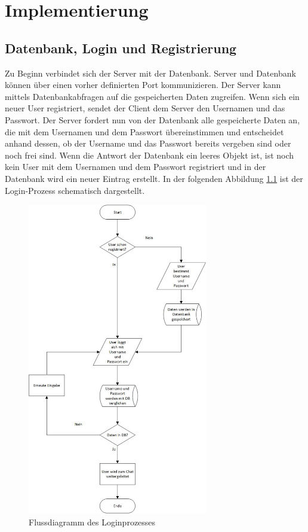 
\chapter{Implementierung}\label{cha:Implementierung}
\section{Datenbank, Login und Registrierung}\label{Datenbank}
Zu Beginn verbindet sich der Server mit der Datenbank. Server und Datenbank können über einen vorher definierten Port kommunizieren. Der Server kann mittels Datenbankabfragen auf die gespeicherten Daten zugreifen. Wenn sich ein neuer User registriert, sendet der Client dem Server den Usernamen und das Passwort. Der Server fordert nun von der Datenbank alle gespeicherte Daten an, die mit dem Usernamen und dem Passwort übereinstimmen und entscheidet anhand dessen, ob der Username und das Passwort bereits vergeben sind oder noch frei sind. Wenn die Antwort der Datenbank ein leeres Objekt ist, ist noch kein User mit dem Usernamen und dem Passwort registriert und in der Datenbank wird ein neuer Eintrag erstellt. 
In der folgenden Abbildung \ref{fig:login} ist der Login-Prozess schematisch dargestellt.
\begin{figure}[H]
\centering
\includegraphics[width=0.7\textwidth]{images/login.jpg}
\caption{Flussdiagramm des Loginprozesses}
\label{fig:login}
\end{figure}

